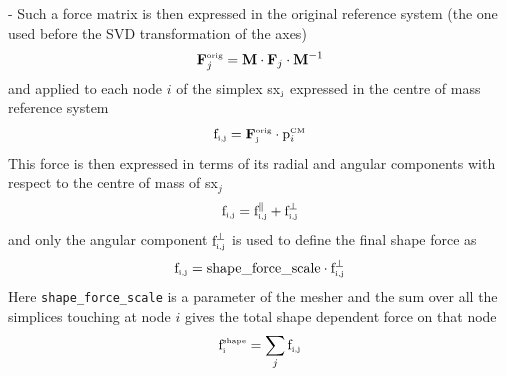 \documentclass[10pt,a4paper]{book}
\newcommand{\py}[1]{\texttt{\color{blue}#1}}
\begin{document}
\begin{itemize}
  - Such a force matrix is then expressed
  in the original reference system (the one
  used before the SVD transformation of the axes)
   \begin{equation}
     \mathbf{F}^{\textrm{\tiny orig}}_j =
     \mathbf{M} \cdot \mathbf{F}_j \cdot \mathbf{M}^{-1} 
  \end{equation}
  and applied to each node $i$ of the simplex sx$_{\textrm{\tiny j}}$
  expressed in the centre of mass reference system
  \begin{equation}
    \textrm{f}_{\textrm{\tiny i,j}} =
    \mathbf{F}^{\textrm{\tiny
        orig}}_{\textrm{\tiny j}} \cdot  \textrm{p}^{\textrm{\tiny
        CM}}_{\tiny i}  
  \end{equation}
  This force is then expressed in terms of its radial and angular
  components with respect to the centre of mass of sx$_j$
  \begin{equation}
    \textrm{f}_{\textrm{\tiny i,j}} =  \textrm{f}^\parallel_{\textrm{\tiny i,j}} + \textrm{f}^\perp_{\textrm{\tiny i,j}} 
  \end{equation}
  and only the angular component $\textrm{f}^\perp_{\textrm{\tiny
      i,j}}$ is used to define the final shape force as 
  \begin{equation}
    \textrm{f}_{\textrm{\tiny i,j}} = \textrm{shape\_force\_scale}
    \cdot \textrm{f}^\perp_{\textrm{\tiny
      i,j}} 
  \end{equation}
  Here \py{shape\_force\_scale} is a parameter of the mesher and
  the sum over all the simplices touching at node $i$ gives the total
  shape dependent force on that node
  \begin{equation}
    \textrm{f}^{\textrm{\tiny shape}}_{\textrm{\tiny i}} = \sum_j \textrm{f}_{\textrm{\tiny i,j}} 
  \end{equation}


\end{itemize}
\end{document}
